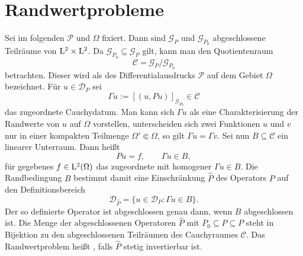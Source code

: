 \section{Randwertprobleme}
Sei im folgenden $\mathcal P$ und $\Omega$ fixiert. Dann sind  $\mathcal G_P$ und $\mathcal G_{P_0}$ abgeschlossene Teilräume von $\mathrm L^2\times\mathrm L^2$. Da
$\mathcal G_{P_0}\subseteq \mathcal G_P$ gilt, kann man den Quotientenraum
\begin{equation}
   \mathcal C = \mathcal G_P / \mathcal G_{P_0}
\end{equation}
betrachten. Dieser wird als  des Differentialausdrucks $\mathcal P$ auf dem Gebiet $\Omega$ bezeichnet. Für $u\in\mathcal D_P$ sei
\begin{equation}
     \Gamma u := [ (u,Pu) ]_{\mathcal G_{P_0}} \in \mathcal C
\end{equation}
das zugeordnete Cauchydatum. Man kann sich $\Gamma u$ als eine Charakterisierung der Randwerte von $u$ auf $\Omega$ vorstellen, unterscheiden sich zwei Funktionen $u$ und $v$ nur in einer kompakten Teilmenge $\Omega' \Subset \Omega$, so gilt $\Gamma u=\Gamma v$.
Sei nun $B\subseteq\mathcal C$ ein linearer Unterraum. Dann heißt 
\begin{equation}
    Pu = f,\qquad \Gamma u\in B,
\end{equation}
f\"ur gegebenes $f\in\mathrm L^2(\Omega)$ das zugeordnete  mit homogener  $\Gamma u\in B$. Die Randbedingung 
$B$ bestimmt damit eine Einschr\"ankung $\widehat P$ des Operators $P$ auf den Definitionsbereich
\begin{equation}
    \mathcal D_{\widehat P} = \{ u \in \mathcal D_P : \Gamma u\in B \}.
\end{equation}
Der so definierte Operator ist abgeschlossen genau dann, wenn $B$ abgeschlossen ist. Die Menge der abgeschlossenen Operatoren $\widehat P$ mit $P_0\subseteq\widehat P\subseteq P$ steht in Bijektion zu den abgeschlossenen Teilräumen des Cauchyraumes $\mathcal C$.
Das Randwertproblem heißt , falls $\widehat P$ stetig invertierbar ist.

